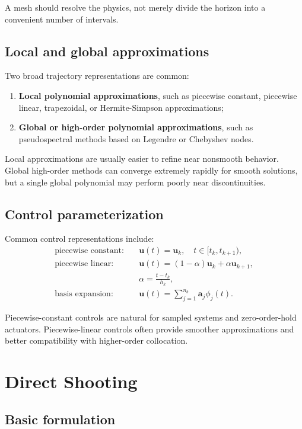 \documentclass[11pt]{article}
\newcommand{\vect}[1]{\boldsymbol{#1}}
\newcommand{\uvec}{\vect{u}}
\begin{document}
A mesh should resolve the physics, not merely divide the horizon into a convenient number of intervals.

\subsection{Local and global approximations}

Two broad trajectory representations are common:
\begin{enumerate}[leftmargin=1.5em]
  \item \textbf{Local polynomial approximations}, such as piecewise constant, piecewise linear, trapezoidal, or Hermite-Simpson approximations;
  \item \textbf{Global or high-order polynomial approximations}, such as pseudospectral methods based on Legendre or Chebyshev nodes.
\end{enumerate}

Local approximations are usually easier to refine near nonsmooth behavior. Global high-order methods can converge extremely rapidly for smooth solutions, but a single global polynomial may perform poorly near discontinuities.

\subsection{Control parameterization}

Common control representations include:
\begin{align}
\text{piecewise constant:} \quad & \uvec(t)=\uvec_k, \quad t\in[t_k,t_{k+1}),\\
\text{piecewise linear:} \quad & \uvec(t)=\left(1-\alpha\right)\uvec_k+\alpha\uvec_{k+1}, \\
& \alpha=\frac{t-t_k}{h_k},\\
\text{basis expansion:} \quad & \uvec(t)=\sum_{j=1}^{n_b}\vect{a}_j\phi_j(t).
\end{align}

Piecewise-constant controls are natural for sampled systems and zero-order-hold actuators. Piecewise-linear controls often provide smoother approximations and better compatibility with higher-order collocation.

\section{Direct Shooting}

\subsection{Basic formulation}
\end{document}
